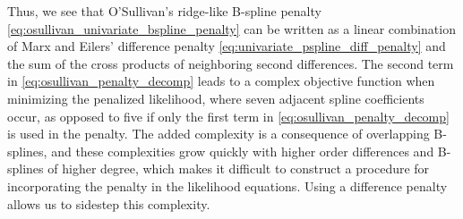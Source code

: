 \documentclass[12pt]{article}
\begin{document}
Thus, we see that O'Sullivan's ridge-like B-spline penalty \ref{eq:osullivan_univariate_bspline_penalty} can be written as a linear combination of Marx and Eilers' difference penalty \ref{eq:univariate_pspline_diff_penalty} and the sum of the cross products of neighboring second differences. The second term in \ref{eq:osullivan_penalty_decomp} leads to a complex objective function when minimizing the penalized likelihood, where seven adjacent spline coefficients occur, as opposed to five if only the first term in \ref{eq:osullivan_penalty_decomp} is used in the penalty. The added complexity is a consequence of overlapping B-splines, and these complexities grow quickly with higher order differences and B-splines of higher degree, which makes it difficult to construct a procedure for incorporating the penalty in the likelihood equations. Using a difference penalty allows us to sidestep this complexity.
\end{document}
